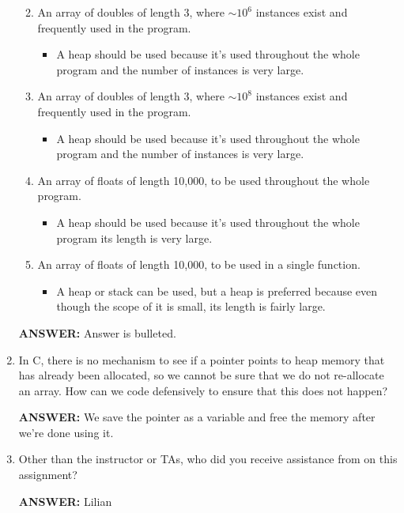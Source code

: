 \begin{enumerate}
\begin{enumerate}
\begin{itemize}
        \end{itemize}
        \item An array of doubles of length 3, where $\sim 10^6$ instances exist and frequently used in the program.
        \begin{itemize}
            \item A heap should be used because it's used throughout the whole program and the number of instances is very large.
        \end{itemize}
        \item An array of doubles of length 3, where $\sim 10^8$ instances exist and frequently used in the program.
        \begin{itemize}
            \item A heap should be used because it's used throughout the whole program and the number of instances is very large.
        \end{itemize}
        \item An array of floats of length 10,000, to be used throughout the whole program.
        \begin{itemize}
            \item A heap should be used because it's used throughout the whole program its length is very large.
        \end{itemize}
        \item An array of floats of length 10,000, to be used in a single function.
        \begin{itemize}
            \item A heap or stack can be used, but a heap is preferred because even though the scope of it is small, its length is fairly large.
        \end{itemize}
    \end{enumerate}

    \textbf{ANSWER:} Answer is bulleted.
    

    \item In C, there is no mechanism to see if a pointer points to heap memory that has already been allocated, so we cannot be sure that we do not re-allocate an array.  How can we code defensively to ensure that this does not happen?

    \textbf{ANSWER:} We save the pointer as a variable and free the memory after we're done using it.
    

    \item Other than the instructor or TAs, who did you receive assistance from on this assignment?
    
    \textbf{ANSWER:} Lilian
    
\end{enumerate}
